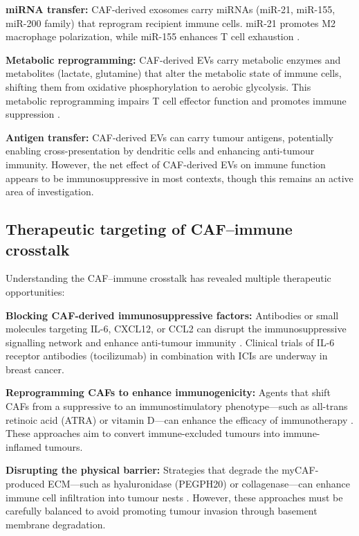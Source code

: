 \textbf{miRNA transfer:} CAF-derived exosomes carry miRNAs (miR-21, miR-155, miR-200 family) that reprogram recipient immune cells. miR-21 promotes M2 macrophage polarization, while miR-155 enhances T cell exhaustion \citep{zhao2023}.

\textbf{Metabolic reprogramming:} CAF-derived EVs carry metabolic enzymes and metabolites (lactate, glutamine) that alter the metabolic state of immune cells, shifting them from oxidative phosphorylation to aerobic glycolysis. This metabolic reprogramming impairs T cell effector function and promotes immune suppression \citep{zhao2023}.

\textbf{Antigen transfer:} CAF-derived EVs can carry tumour antigens, potentially enabling cross-presentation by dendritic cells and enhancing anti-tumour immunity. However, the net effect of CAF-derived EVs on immune function appears to be immunosuppressive in most contexts, though this remains an active area of investigation.

\subsection{Therapeutic targeting of CAF--immune crosstalk}

Understanding the CAF--immune crosstalk has revealed multiple therapeutic opportunities:

\textbf{Blocking CAF-derived immunosuppressive factors:} Antibodies or small molecules targeting IL-6, CXCL12, or CCL2 can disrupt the immunosuppressive signalling network and enhance anti-tumour immunity \citep{serve2023}. Clinical trials of IL-6 receptor antibodies (tocilizumab) in combination with ICIs are underway in breast cancer.

\textbf{Reprogramming CAFs to enhance immunogenicity:} Agents that shift CAFs from a suppressive to an immunostimulatory phenotype---such as all-trans retinoic acid (ATRA) or vitamin D---can enhance the efficacy of immunotherapy \citep{erve2024}. These approaches aim to convert immune-excluded tumours into immune-inflamed tumours.

\textbf{Disrupting the physical barrier:} Strategies that degrade the myCAF-produced ECM---such as hyaluronidase (PEGPH20) or collagenase---can enhance immune cell infiltration into tumour nests \citep{provenzano2012}. However, these approaches must be carefully balanced to avoid promoting tumour invasion through basement membrane degradation.
